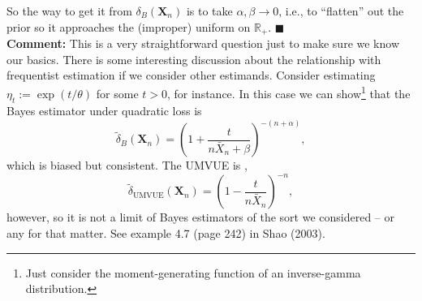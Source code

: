 {So the way to get it from $\delta_{B}(\boldsymbol{X}_n)$ is to take $\alpha, \beta \to 0$, i.e., to ``flatten'' out the prior so it approaches the (improper) uniform on $\mathbb{R}_+$.
$\blacksquare$\\
\textbf{Comment:} This is a very straightforward question just to make sure we know our basics.
There is some interesting discussion about the relationship with frequentist estimation if we consider other estimands. 
Consider estimating $\eta_t := \exp(t/\theta)$ for some $t>0$, for instance.
In this case we can show\footnote{Just consider the moment-generating function of an inverse-gamma distribution.} that the Bayes estimator under quadratic loss is
\begin{equation*}
    \tilde{\delta}_B(\boldsymbol{X}_n) = \left(1 + \frac{t}{n \bar{X}_n + \beta}\right)^{-(n + \alpha)},
\end{equation*}
which is biased but consistent. 
The UMVUE is ,
\begin{equation*}
        \tilde{\delta}_{\text{UMVUE}}(\boldsymbol{X}_n) = \left(1 - \frac{t}{n \bar{X}_n}\right)^{-n},
\end{equation*}
however, so it is not a limit of Bayes estimators of the sort we considered -- or any for that matter.
See example 4.7 (page 242) in Shao (2003).
}